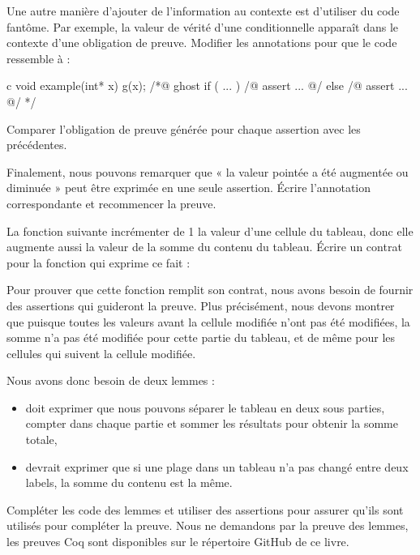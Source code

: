 Une autre manière d'ajouter de l'information au contexte est d'utiliser du
code fantôme. Par exemple, la valeur de vérité d'une conditionnelle apparaît
dans le contexte d'une obligation de preuve. Modifier les annotations pour que
le code ressemble à :


\begin{CodeBlock}{c}
void example(int* x){
  g(x);
  /*@ ghost
   if ( ... ){
    /@ assert ... @/
   } else {
    /@ assert ... @/
   }
  */
}
\end{CodeBlock}

Comparer l'obligation de preuve générée pour chaque assertion avec les précédentes.


Finalement, nous pouvons remarquer que « la valeur pointée a été augmentée ou
diminuée » peut être exprimée en une seule assertion. Écrire l'annotation
correspondante et recommencer la preuve.


\label{l4:proof-methodologies-triggering-lemmas-exercises-sum}


La fonction suivante incrémenter de 1 la valeur d'une cellule du tableau, donc
elle augmente aussi la valeur de la somme du contenu du tableau. Écrire un contrat
pour la fonction qui exprime ce fait :




Pour prouver que cette fonction remplit son contrat, nous avons besoin de fournir
des assertions qui guideront la preuve. Plus précisément, nous devons montrer que
puisque toutes les valeurs avant la cellule modifiée n'ont pas été modifiées, la
somme n'a pas été modifiée pour cette partie du tableau, et de même pour les
cellules qui suivent la cellule modifiée.


Nous avons donc besoin de deux lemmes :

\begin{itemize}
    \item {} doit exprimer que nous pouvons séparer le
          tableau en deux sous parties, compter dans chaque partie et sommer les
          résultats pour obtenir la somme totale,
    \item {} devrait exprimer que si une plage dans un
          tableau n'a pas changé entre deux labels, la somme du contenu est la
          même.
\end{itemize}


Compléter les code des lemmes et utiliser des assertions pour assurer qu'ils sont
utilisés pour compléter la preuve. Nous ne demandons par la preuve des lemmes, les
preuves Coq sont disponibles sur le répertoire GitHub de ce livre.
